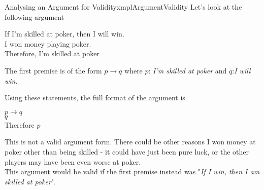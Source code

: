 \begin{exmpl}[label={exmpl:argumentValidity}]{Analysing an Argument for Validity}{xmplArgumentValidity}
    Let's look at the following argument\\
    \begin{center}
        If I'm skilled at poker, then I will win.\\

        I won money playing poker.\\

        Therefore, I'm skilled at poker
    \end{center}
    The first premise is of the form $p \to q$ where $p$: \emph{I'm skilled at poker} and $q$:\emph{I will win}.

    Using these statements, the full format of the argument is \\
    \begin{center}
        $p \to q$\\
        $q$\\
        Therefore $p$
    \end{center}

    This is not a valid argument form. There could be other reasons I won money at poker other than being skilled - it could have just been pure luck, or the other players may have been even worse at poker.\\

    This argument would be valid if the first premise instead was "\emph{If I win, then I am skilled at poker}".
\end{exmpl}
